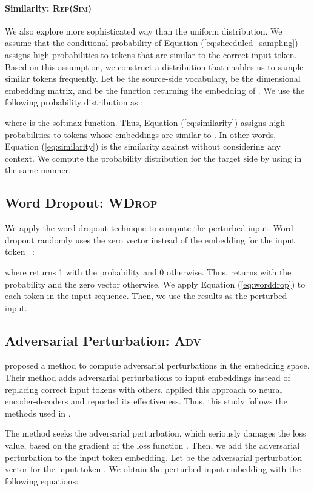 \documentclass[11pt]{article}
\newcommand{\similarity}{\textsc{Rep(Sim)}}
\newcommand{\worddrop}{\textsc{WDrop}}
\newcommand{\adv}{\textsc{Adv}}
\begin{document}
\paragraph{Similarity: \similarity{}}
We also explore more sophisticated way than the uniform distribution.
We assume that the conditional probability of Equation (\ref{eq:shceduled_sampling}) assigns high probabilities to tokens that are similar to the correct input token.
Based on this assumption, we construct a distribution that enables us to sample similar tokens frequently.
Let  be the source-side vocabulary,  be the  dimensional embedding matrix, and  be the function returning the embedding of .
We use the following probability distribution as :

where  is the softmax function.
Thus, Equation (\ref{eq:similarity}) assigns high probabilities to tokens whose embeddings are similar to .
In other words, Equation (\ref{eq:similarity}) is the similarity against  without considering any context.
We compute the probability distribution for the target side by using  in the same manner.


\subsection{Word Dropout: \worddrop{}}
We apply the word dropout technique to compute the perturbed input.
Word dropout randomly uses the zero vector instead of the embedding  for the input token ~\cite{NIPS2016_6241}:

where  returns 1 with the probability  and 0 otherwise.
Thus,  returns  with the probability  and the zero vector otherwise.
We apply Equation (\ref{eq:worddrop}) to each token in the input sequence.
Then, we use the results as the perturbed input.


\subsection{Adversarial Perturbation: \adv{}}
 proposed a method to compute adversarial perturbations in the embedding space.
Their method adds adversarial perturbations to input embeddings instead of replacing correct input tokens with others.
 applied this approach to neural encoder-decoders and reported its effectiveness.
Thus, this study follows the methods used in .


The method seeks the adversarial perturbation, which seriously damages the loss value, based on the gradient of the loss function .
Then, we add the adversarial perturbation to the input token embedding.
Let  be the adversarial perturbation vector for the input token .
We obtain the perturbed input embedding  with the following equations:
\end{document}

